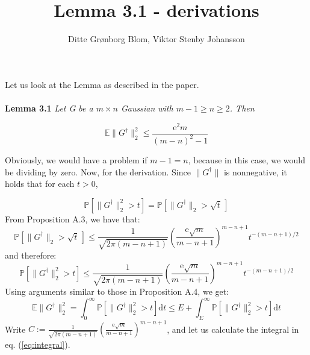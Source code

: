 \documentclass{article}
\title{Lemma 3.1 - derivations}
\author{Ditte Grønborg Blom, Viktor Stenby Johansson}
\begin{document}
\maketitle
Let us look at the Lemma as described in the paper. 
\\\\
\textbf{Lemma 3.1} \textit{Let G be a $m \times n$ Gaussian with $m-1 \geq n \geq 2$. Then}

\begin{equation}
\mathbb{E}\|G^\dag\|_2^2 \leq \frac{\text{e}^2m}{(m-n)^2-1}	
\end{equation}

Obviously, we would have a problem if $m-1=n$, because in this case, we would be dividing by zero. Now, for the derivation. Since $\|G^\dag\|$ is nonnegative, it holds that for each $t > 0$,


\begin{equation}
\mathbb{P}\left[\|G^\dag\|_2^2 > t\right] = \mathbb{P}\left[\|G^\dag\|_2 > \sqrt{t}\,\right]
\end{equation}
From Proposition A.3, we have that:
\begin{equation}
\mathbb{P}\left[\|G^\dag\|_2 > \sqrt{t}\,\right]	 \leq \frac{1}{\sqrt{2\pi(m-n+1)}}\left(\frac{\text{e} \sqrt{m}}{m-n+1}\right)^{m-n+1}t^{-(m-n+1)/2}
\end{equation}
and therefore:
\begin{equation}
	\mathbb{P}\left[\|G^\dag\|_2^2 > t \right] \leq \frac{1}{\sqrt{2\pi(m-n+1)}}\left(\frac{\text{e} \sqrt{m}}{m-n+1}\right)^{m-n+1}t^{-(m-n+1)/2}
\end{equation}
Using arguments similar to those in Proposition A.4, we get:
\begin{equation}
\mathbb{E}\|G^\dag\|_2^2 = \int_{0}^{\infty} \mathbb{P}\left[\|G^\dag\|_2^2 > t\right] \text{d}t \leq E+\int_{E}^{\infty} \mathbb{P}\left[\|G^\dag\|_2^2 > t\right] \text{d}t
\label{eq:integral}
\end{equation}
\clearpage
Write $C:= \frac{1}{\sqrt{2\pi(m-n+1)}} \left(\frac{\text{e} \sqrt{m}}{m-n+1} \right)^{m-n+1}$, and let us calculate the integral in eq. (\ref{eq:integral}).
\end{document}
